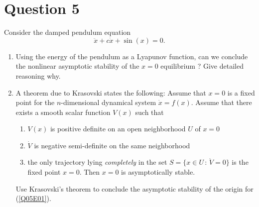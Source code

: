 \documentclass[twoside,10pt,a4paper]{article}
\begin{document}
\newpage

\section*{Question 5}
Consider the damped pendulum equation
\begin{equation}\label{Q05E01}
	\ddot{x} + c\dot{x} + \sin(x) = 0.
\end{equation}

\begin{enumerate}[label=(\alph*)]
	\item Using the energy of the pendulum as a Lyapunov function, can we conclude the nonlinear asymptotic stability of the $x=0$ equilibrium ? Give detailed reasoning why.
	\item A theorem due to Krasovski states the following: Assume that $x=0$ is a fixed point for the $n$-dimensional dynamical system $\dot{x}=f(x)$. Assume that there exists a smooth scalar function $V(x)$ such that
	\begin{enumerate}[label=(\roman*)]
		\item $V(x)$ is positive definite on an open neighborhood $U$ of $x=0$
		\item $\dot{V}$ is negative semi-definite on the same neighborhood
		\item the only trajectory lying \textit{completely} in the set $S= \{ x\in U \, : \, \dot{V}=0 \}$ is the fixed point $x=0$. Then $x=0$ is asymptotically stable.
	\end{enumerate}
	Use Krasovski's theorem to conclude the asymptotic stability of the origin for (\ref{Q05E01}).
\end{enumerate}
\end{document}
